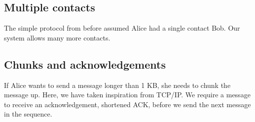 \subsection{Multiple contacts}

The simple protocol from before assumed Alice had a single contact Bob. Our system allows many more contacts.


\subsection{Chunks and acknowledgements}

If Alice wants to send a message longer than 1 KB, she needs to chunk the message up. Here, we have taken inspiration from TCP/IP. We require a message to receive an acknowledgement, shortened ACK, before we send the next message in the sequence.


